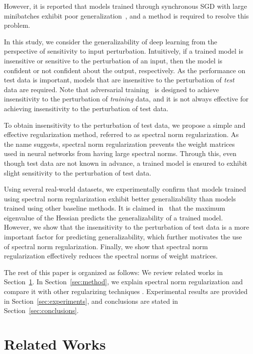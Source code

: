 However, it is reported that models trained through synchronous SGD with large minibatches exhibit poor generalization~\cite{Keskar:2017tz}, and a method is required to resolve this problem.

In this study, we consider the generalizability of deep learning from the perspective of sensitivity to input perturbation. Intuitively, if a trained model is insensitive or sensitive to the perturbation of an input, then the model is confident or not confident about the output, respectively. As the performance on test data is important, models that are insensitive to the perturbation of \emph{test} data are required. Note that adversarial training~\cite{Szegedy:2014vw,Goodfellow:2015tl} is designed to achieve insensitivity to the perturbation of \emph{training} data, and it is not always effective for achieving insensitivity to the perturbation of test data.

To obtain insensitivity to the perturbation of test data, we propose a simple and effective regularization method,  referred to as spectral norm regularization. As the name suggests, spectral norm regularization prevents the weight matrices used in neural networks  from having large spectral norms. Through this, even though test data are not known in advance, a trained model is ensured to exhibit slight sensitivity to the perturbation of test data.

Using several real-world datasets, we experimentally confirm that models trained using spectral norm regularization exhibit better generalizability than  models trained using other baseline methods. It is claimed in~\cite{Keskar:2017tz} that the maximum eigenvalue of the Hessian predicts the generalizability of a trained model. However, we show that the insensitivity to the perturbation of test data is a more important factor for predicting generalizability, which further motivates the use of spectral norm regularization. Finally, we show that spectral norm regularization effectively reduces the spectral norms of weight matrices.

The rest of this paper is organized as follows: We review related works in Section~\ref{sec:related}.
In Section~\ref{sec:method}, we explain spectral norm regularization and compare it with other regularizing techniques . Experimental results are provided in Section~\ref{sec:experiments}, and conclusions are stated in Section~\ref{sec:conclusions}.

\section{Related Works}\label{sec:related}

